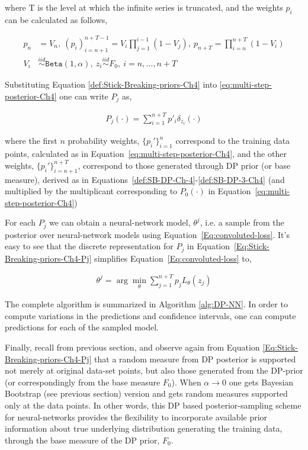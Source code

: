\documentclass[10pt]{article}
\begin{document}
where T is the level at which the infinite series is truncated, and the weights $p_{i}$ can be calculated as follows,

\begin{align}
\label{def:SB-DP-Ch-4}
p_{n}&= V_{n}, \: (p_{i})_{i=n+1}^{n+T-1}= V_{i}\prod_{j=1}^{i-1}(1-V_{j}), \: p_{n+T}= \prod_{i=n}^{n+T}(1-V_{i})\\ \label{def:SB-DP-3-Ch4}
V_{i}& \stackrel{iid}{\sim}\texttt{Beta}(1,\alpha), \: z_{i} \stackrel{iid}{\sim} F_{0},\: i=n,..., n+T
\end{align} 

Substituting Equation \ref{def:Stick-Breaking-priors-Ch4} into \ref{eq:multi-step-posterior-Ch4} one can write $P_{j}$ as,

\begin{align}\label{Eq:Stick-Breaking-priors-Ch4-Pj}
{P_{j}}(\cdot) = \sum_{i=1}^{n+T}p'_{i}\delta_{z_{i}}(\cdot)
\end{align} 

\noindent where the first $n$ probability weights, $\{{p_{i}'\}_{i=1}^n}$ correspond to the training data points, calculated as in Equation~\ref{eq:multi-step-posterior-Ch4}, and the other weights, $\{{p_{i}'\}_{i=n+1}^{n+T}}$, correspond to those generated through DP prior (or base measure), derived as in Equations~\ref{def:SB-DP-Ch-4}-\ref{def:SB-DP-3-Ch4} (and multiplied by the multiplicant corresponding to $P_{0}(\cdot)$ in Equation~\ref{eq:multi-step-posterior-Ch4})

\noindent For each $P_{j}$ we can obtain a neural-network model, $\theta^{j}$, i.e. a sample from the posterior over neural-network models using Equation~\ref{Eq:convoluted-loss}. It's easy to see that the discrete representation for $P_{j}$ in Equation~\ref{Eq:Stick-Breaking-priors-Ch4-Pj} simplifies Equation~\ref{Eq:convoluted-loss} to,

\begin{align}\label{eq:coovoluted-loss-Pj}
\theta^{j} = \arg \min_{\theta}\sum_{j=1}^{n+T} p_{j}L_{\theta}(z_{j})
\end{align}

\noindent The complete algorithm is summarized in Algorithm \ref{alg:DP-NN}. In order to compute variations in the predictions and confidence intervals, one can compute predictions for each of the sampled model. 

\noindent Finally, recall from previous section, and observe again from Equation \ref{Eq:Stick-Breaking-priors-Ch4-Pj} that a random measure from DP posterior is supported not merely at original data-set points, but also those generated from the DP-prior (or correspondingly from the base measure $F_{0}$).  When $\alpha \to 0$ one gets Bayesian Bootstrap (see previous section) version and gets random measures supported only at the data points. In other words, this DP based posterior-sampling scheme for neural-networks provides the flexibility to incorporate  available prior information about true underlying distribution generating the training data, through the base measure of the DP prior, $F_{0}$.
\end{document}
